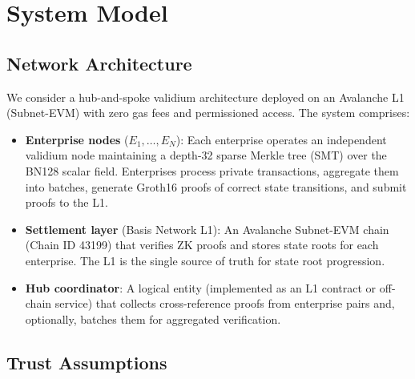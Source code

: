 
\section{System Model}

\subsection{Network Architecture}

We consider a hub-and-spoke validium architecture deployed on an Avalanche L1
(Subnet-EVM) with zero gas fees and permissioned access. The system comprises:

\begin{itemize}
\item \textbf{Enterprise nodes} ($E_1, \ldots, E_N$): Each enterprise
  operates an independent validium node maintaining a depth-32 sparse Merkle
  tree (SMT) over the BN128 scalar field. Enterprises process private
  transactions, aggregate them into batches, generate Groth16 proofs of
  correct state transitions, and submit proofs to the L1.

\item \textbf{Settlement layer} (Basis Network L1): An Avalanche Subnet-EVM
  chain (Chain ID 43199) that verifies ZK proofs and stores state roots for
  each enterprise. The L1 is the single source of truth for state root
  progression.

\item \textbf{Hub coordinator}: A logical entity (implemented as an L1
  contract or off-chain service) that collects cross-reference proofs from
  enterprise pairs and, optionally, batches them for aggregated verification.
\end{itemize}

\subsection{Trust Assumptions}

